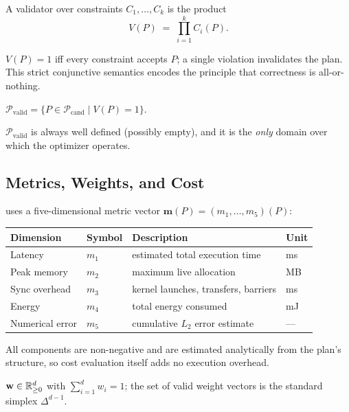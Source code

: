 \begin{definition}[Validator]
A validator over constraints $C_1, \ldots, C_k$ is the product
\begin{equation}
V(P) \;=\; \prod_{i=1}^{k} C_i(P).
\label{eq:validator}
\end{equation}
\end{definition}

$V(P) = 1$ iff every constraint accepts $P$; a single violation
invalidates the plan. This strict conjunctive semantics encodes the
principle that correctness is all-or-nothing.

\begin{definition}
$\mathcal{P}_{\text{valid}} =
 \{P \in \mathcal{P}_{\text{cand}} \mid V(P) = 1\}$.
\end{definition}

$\mathcal{P}_{\text{valid}}$ is always well defined (possibly empty),
and it is the \emph{only} domain over which the \gate{} optimizer
operates.

\subsection{Metrics, Weights, and Cost}

\gate{} uses a five-dimensional metric vector
$\mathbf{m}(P) = (m_1, \ldots, m_5)(P)$:

\begin{center}
\small
\begin{tabular}{@{}llll@{}}
\toprule
Dimension & Symbol & Description & Unit \\
\midrule
Latency & $m_1$ & estimated total execution time & ms \\
Peak memory & $m_2$ & maximum live allocation & MB \\
Sync overhead & $m_3$ & kernel launches, transfers, barriers & ms \\
Energy & $m_4$ & total energy consumed & mJ \\
Numerical error & $m_5$ & cumulative $L_2$ error estimate & --- \\
\bottomrule
\end{tabular}
\end{center}

All components are non-negative and are estimated analytically from the
plan's structure, so cost evaluation itself adds no execution overhead.

\begin{definition}
$\mathbf{w} \in \mathbb{R}^d_{\geq 0}$ with $\sum_{i=1}^d w_i = 1$; the set of
valid weight vectors is the standard simplex $\Delta^{d-1}$.
\end{definition}

